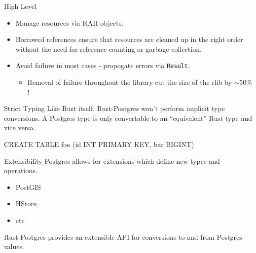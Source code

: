 \documentclass{beamer}
\begin{document}
\begin{frame}[fragile]{High Level}
    \begin{itemize}
        \item Manage resources via RAII objects.
        \item Borrowed references ensure that resources are cleaned up in the right order without the need for reference counting or garbage collection.
        \item Avoid failure in most cases - propogate errors via \verb!Result!.
        \begin{itemize}
            \item Removal of failure throughout the library cut the size of the rlib by $\sim50\%$!
        \end{itemize}
    \end{itemize}
\end{frame}

\begin{frame}[fragile]{Strict Typing}
    Like Rust itself, Rust-Postgres won't perform implicit type conversions. A
    Postgres type is only convertable to an ``equivalent'' Rust type and vice
    versa.
    \begin{sqlcode}
CREATE TABLE foo (id INT PRIMARY KEY, bar BIGINT) 
    \end{sqlcode}
\end{frame}

\begin{frame}{Extensibility}
    Postgres allows for extensions which define new types and operations.
    \begin{itemize}
        \item PostGIS
        \item HStore
        \item etc
    \end{itemize}

    Rust-Postgres provides an extensible API for conversions to and from
    Postgres values.
\end{frame}
\end{document}
